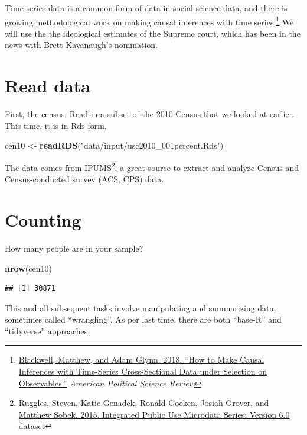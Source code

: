 \documentclass[]{book}
\newenvironment{Shaded}{\begin{snugshade}}{\end{snugshade}}
\newcommand{\KeywordTok}[1]{\textcolor[rgb]{0.13,0.29,0.53}{\textbf{#1}}}
\newcommand{\NormalTok}[1]{#1}
\newcommand{\StringTok}[1]{\textcolor[rgb]{0.31,0.60,0.02}{#1}}
\let\rmarkdownfootnote\footnote%
\def\footnote{\protect\rmarkdownfootnote}
\theoremstyle{definition}
\theoremstyle{definition}
\theoremstyle{definition}
\theoremstyle{remark}
\begin{document}
Time series data is a common form of data in social science data, and there is growing methodological work on making causal inferences with time series.\footnote{\href{https://doi.org/10.1017/S0003055418000357}{Blackwell, Matthew, and Adam Glynn. 2018. ``How to Make Causal Inferences with Time-Series Cross-Sectional Data under Selection on Observables.''} \emph{American Political Science Review}} We will use the the ideological estimates of the Supreme court, which has been in the news with Brett Kavanaugh's nomination.

\hypertarget{read-data-2}{%
\section{Read data}\label{read-data-2}}

First, the census. Read in a subset of the 2010 Census that we looked at earlier. This time, it is in Rds form.

\begin{Shaded}
\begin{Highlighting}[]
\NormalTok{cen10 <-}\StringTok{ }\KeywordTok{readRDS}\NormalTok{(}\StringTok{"data/input/usc2010_001percent.Rds"}\NormalTok{)}
\end{Highlighting}
\end{Shaded}

The data comes from IPUMS\footnote{\href{http://doi.org/10.18128/D010.V6.0}{Ruggles, Steven, Katie Genadek, Ronald Goeken, Josiah Grover, and Matthew Sobek. 2015. Integrated Public Use Microdata Series: Version 6.0 dataset}}, a great source to extract and analyze Census and Census-conducted survey (ACS, CPS) data.

\hypertarget{counting}{%
\section{Counting}\label{counting}}

How many people are in your sample?

\begin{Shaded}
\begin{Highlighting}[]
\KeywordTok{nrow}\NormalTok{(cen10)}
\end{Highlighting}
\end{Shaded}

\begin{verbatim}
## [1] 30871
\end{verbatim}

This and all subsequent tasks involve manipulating and summarizing data, sometimes called ``wrangling''. As per last time, there are both ``base-R'' and ``tidyverse'' approaches.
\end{document}
